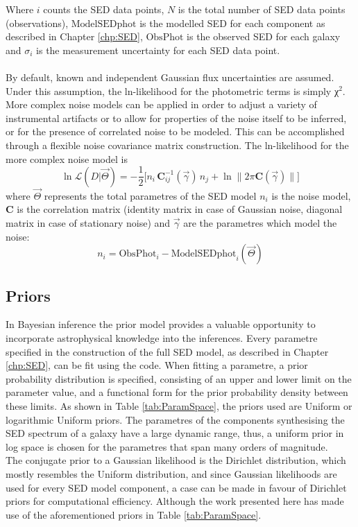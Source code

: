 Where $i$ counts the SED data points, $N$ is the total number of SED data points (observations), $\mbox{ModelSEDphot}$ is the modelled SED for each component as described in Chapter \ref{chp:SED}, $\mbox{ObsPhot}$ is the observed SED for each galaxy and $\sigma_i$ is the measurement uncertainty for each SED data point.\\ \\
By default, known and independent Gaussian flux uncertainties are assumed. Under this assumption, the ln-likelihood for the photometric terms is simply χ$^2$. More complex noise models can be applied in order to adjust a variety of instrumental artifacts or to allow for properties of the noise itself to be inferred, or for the presence of correlated noise to be modeled.
This can be accomplished through a flexible noise covariance matrix construction.
The ln-likelihood for the more complex noise model is
\begin{equation}
    \ln \mathscr{L}(D|\vec\Theta) =-\dfrac{1}{2} \Big[  n_i \,\mathbf{C}^{-1}_{ij}(\vec\gamma) \, n_j  + \ln\|2\pi \mathbf{C}(\vec\gamma) \| \Big]  
\end{equation}
where $\vec\Theta$ represents the total parametres of the SED model $n_i$ is the noise model, $\mathbf{C}$ is the correlation matrix (identity matrix in case of Gaussian noise, diagonal matrix in case of stationary noise) and $\vec\gamma$ are the parametres which model the noise:
\begin{equation}
     n_i  =  \mbox{ObsPhot}_i  - \mbox{ModelSEDphot}_i( \vec\Theta)
\end{equation}
\subsection{Priors}\label{sec:Prior}\label{sec:priors}

In Bayesian inference the prior model provides a valuable opportunity to incorporate astrophysical knowledge into the inferences. 
Every parametre specified in the construction of the full SED model, as described in Chapter \ref{chp:SED}, can be fit using the code. When fitting a parametre, a prior probability distribution is specified, consisting of an upper and lower limit on the parameter value, and a functional form for the prior probability density between these limits. As shown in Table \ref{tab:ParamSpace}, the priors used are Uniform or logarithmic Uniform priors. 
The parametres of the components synthesising the SED spectrum of a galaxy have a large dynamic range, thus, a uniform prior in log space is chosen for the parametres that span many orders of magnitude.\\
The conjugate prior to a Gaussian likelihood is the Dirichlet distribution, which mostly resembles the Uniform distribution, and since Gaussian likelihoods are used for every SED model component, a case can be made\cite{Betancourt2012} in favour of Dirichlet priors for computational efficiency. Although the work presented here has made use of the aforementioned priors in Table \ref{tab:ParamSpace}.

